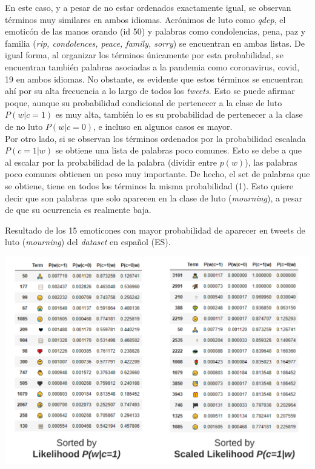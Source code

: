 En este caso, y a pesar de no estar ordenados exactamente igual, se observan términos muy similares en ambos idiomas. Acrónimos de luto como \textit{qdep}, el emoticón de las manos orando (id 50) y palabras como condolencias, pena, paz y familia (\textit{rip, condolences, peace, family, sorry}) se encuentran en ambas listas. De igual forma, al organizar los términos únicamente por esta probabilidad, se encuentran también palabras asociadas a la pandemia como coronavirus, covid, 19 en ambos idiomas. No obstante, es evidente que estos términos se encuentran ahí por su alta frecuencia a lo largo de todos los \textit{tweets}. Esto se puede afirmar poque, aunque su probabilidad condicional de pertenecer a la clase de luto $P(w|c=1)$ es muy alta, también lo es su probabilidad de pertenecer a la clase de no luto $P(w|c=0)$, e incluso en algunos casos es mayor. \\

Por otro lado, si se observan los términos ordenados por la probabilidad escalada $P(c=1|w)$ se obtiene una lista de palabras poco comunes. Esto se debe a que al escalar por la probabilidad de la palabra (dividir entre $p(w)$), las palabras poco comunes obtienen un peso muy importante. De hecho, el set de palabras que se obtiene, tiene en todos los términos la misma probabilidad (1). Esto quiere decir que son palabras que solo aparecen en la clase de luto (\textit{mourning}), a pesar de que su ocurrencia es realmente baja. 

\begin{table}[H]
    \centering
    \caption{Resultado de los 15 emoticones con mayor probabilidad de aparecer en tweets de luto (\textit{mourning}) del \textit{dataset} en español (ES).}
    \label{tab:es_emojis}
    \includegraphics[width=\textwidth]{doc/images/ES_Emojis.png}
\end{table}

